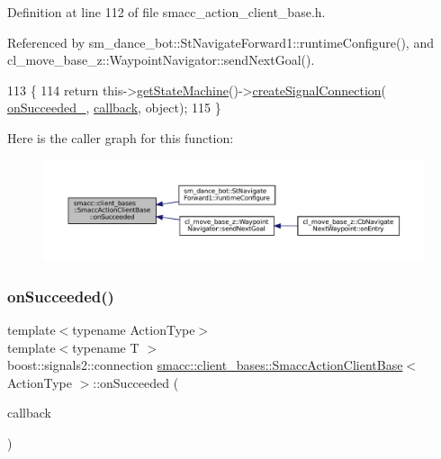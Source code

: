 Definition at line 112 of file smacc\+\_\+action\+\_\+client\+\_\+base.\+h.



Referenced by sm\+\_\+dance\+\_\+bot\+::\+St\+Navigate\+Forward1\+::runtime\+Configure(), and cl\+\_\+move\+\_\+base\+\_\+z\+::\+Waypoint\+Navigator\+::send\+Next\+Goal().


\begin{DoxyCode}
113     \{
114         \textcolor{keywordflow}{return} this->\hyperlink{classsmacc_1_1ISmaccClient_aec51d4712404cb9882b86e4c854bb93a}{getStateMachine}()->\hyperlink{classsmacc_1_1ISmaccStateMachine_adf0f42ade0c65cc471960fe2a7c42da2}{createSignalConnection}(
      \hyperlink{classsmacc_1_1client__bases_1_1SmaccActionClientBase_afa1d615e16c9e825d815a3a3ccaa61df}{onSucceeded\_}, \hyperlink{servers_2opencv__perception__node_2opencv__perception__node_8cpp_a050e697bd654facce10ea3f6549669b3}{callback}, \textcolor{keywordtype}{object});
115     \}
\end{DoxyCode}
Here is the caller graph for this function\+:
\nopagebreak
\begin{figure}[H]
\begin{center}
\leavevmode
\includegraphics[width=350pt]{classsmacc_1_1client__bases_1_1SmaccActionClientBase_af6d77c27d21b2e4f621f53c5f1df088b_icgraph}
\end{center}
\end{figure}
\mbox{\label{classsmacc_1_1client__bases_1_1SmaccActionClientBase_a92053df4ebfd0e49bbbd4ba191bf3975}} 
\subsubsection{\texorpdfstring{on\+Succeeded()}{onSucceeded()}\hspace{0.1cm}{\footnotesize\ttfamily [2/2]}}
{\footnotesize\ttfamily template$<$typename Action\+Type$>$ \\
template$<$typename T $>$ \\
boost\+::signals2\+::connection \hyperlink{classsmacc_1_1client__bases_1_1SmaccActionClientBase}{smacc\+::client\+\_\+bases\+::\+Smacc\+Action\+Client\+Base}$<$ Action\+Type $>$\+::on\+Succeeded (\begin{DoxyParamCaption}\item[{std\+::function$<$ void(Result\+Const\+Ptr \&)$>$}]{callback }\end{DoxyParamCaption})\hspace{0.3cm}{\ttfamily [inline]}}



